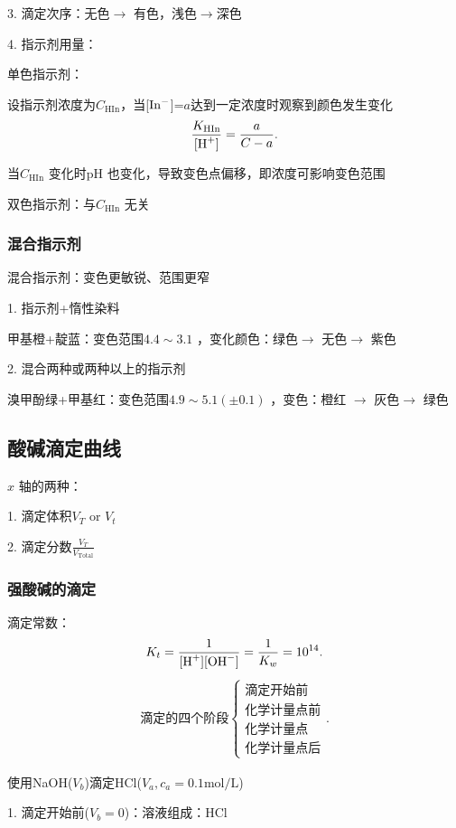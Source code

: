 3. 滴定次序：无色$\to $ 有色，浅色$ \to $深色

4. 指示剂用量：
\begin{eg}
    单色指示剂：

    设指示剂浓度为$C_{\text{HIn}}$，当[$\ce{In-}$]=$a$达到一定浓度时观察到颜色发生变化
    \[
        \frac{K_{\text{HIn}}}{[\ce{H+}]}=\frac{a}{C-a}
    .\] 

    当$C_{\text{HIn}}$ 变化时pH 也变化，导致变色点偏移，即浓度可影响变色范围
\end{eg}
双色指示剂：与$C_{\text{HIn}}$ 无关
\subsubsection{混合指示剂}%
\label{subsub:混合指示剂}
\begin{notation}
    混合指示剂：变色更敏锐、范围更窄
\end{notation}
1. 指示剂+惰性染料
\begin{eg}
    甲基橙+靛蓝：变色范围$4.4\sim 3.1$ ，变化颜色：绿色$\to $ 无色$\to $ 紫色
\end{eg}
2. 混合两种或两种以上的指示剂
\begin{eg}
    溴甲酚绿+甲基红：变色范围$4.9\sim 5.1\left( \pm 0.1 \right) $ ，变色：橙红 $\to $ 灰色$\to $ 绿色
\end{eg}
\subsection{酸碱滴定曲线}%
\label{sub:酸碱滴定曲线}
\begin{notation}
    $x$ 轴的两种：

    1. 滴定体积$V_T\text{ or }V_t$ 

    2. 滴定分数${\frac{V_T}{V_{\text{Total}}}}$
\end{notation}
\subsubsection{强酸碱的滴定}%
\label{subsub:强酸碱的滴定}
滴定常数：\[
    K_t=\frac{1}{[\ce{H+}][\ce{OH-}]}=\frac{1}{K_w}=10^{14}
.\] 
\begin{align*}
    \text{滴定的四个阶段}
    \begin{cases}
        \text{滴定开始前}\\
        \text{化学计量点前}\\
        \text{化学计量点}\\
        \text{化学计量点后}
    \end{cases}
.\end{align*}
\begin{eg}
    使用NaOH($V_b$)滴定HCl($V_a,c_a=0.1\text{mol/L}$)
\end{eg}
1. 滴定开始前($V_b=0$)：溶液组成：HCl

